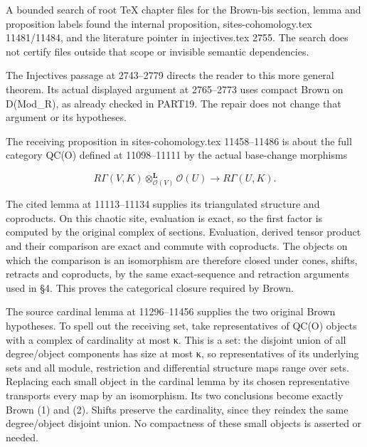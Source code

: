 A bounded search of root TeX chapter files for the Brown-bis section,\allowbreak{} lemma and proposition labels found the internal proposition,\allowbreak{} sites-cohomology.tex 11481/\allowbreak{}11484,\allowbreak{} and the literature pointer in injectives.tex 2755. The search does not certify files outside that scope or invisible semantic dependencies.

The Injectives passage at 2743–\allowbreak{}2779 directs the reader to this more general theorem. Its actual displayed argument at 2765–\allowbreak{}2773 uses compact Brown on D(Mod\_\allowbreak{}R)\allowbreak{},\allowbreak{} as already checked in PART19. The repair does not change that argument or its hypotheses.

The receiving proposition in sites-cohomology.tex 11458–\allowbreak{}11486 is about the full category QC(O)\allowbreak{} defined at 11098–\allowbreak{}11111 by the actual base-change morphisms

\[
 R\Gamma(V,K)\otimes_{\mathcal O(V)}^{\mathbf L}\mathcal O(U)
       \longrightarrow R\Gamma(U,K).
\]

The cited lemma at 11113–\allowbreak{}11134 supplies its triangulated structure and coproducts. On this chaotic site,\allowbreak{} evaluation is exact,\allowbreak{} so the first factor is computed by the original complex of sections. Evaluation,\allowbreak{} derived tensor product and their comparison are exact and commute with coproducts. The objects on which the comparison is an isomorphism are therefore closed under cones,\allowbreak{} shifts,\allowbreak{} retracts and coproducts,\allowbreak{} by the same exact-sequence and retraction arguments used in §4. This proves the categorical closure required by Brown.

The source cardinal lemma at 11296–\allowbreak{}11456 supplies the two original Brown hypotheses. To spell out the receiving set,\allowbreak{} take representatives of QC(O)\allowbreak{} objects with a complex of cardinality at most κ. This is a set:\allowbreak{} the disjoint union of all degree/\allowbreak{}object components has size at most κ,\allowbreak{} so representatives of its underlying sets and all module,\allowbreak{} restriction and differential structure maps range over sets. Replacing each small object in the cardinal lemma by its chosen representative transports every map by an isomorphism. Its two conclusions become exactly Brown (1)\allowbreak{} and (2)\allowbreak{}. Shifts preserve the cardinality,\allowbreak{} since they reindex the same degree/\allowbreak{}object disjoint union. No compactness of these small objects is asserted or needed.

